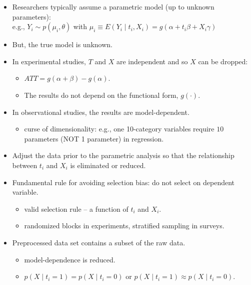 \documentclass[20pt,landscape,pdftex]{foils}
\begin{document}
\hypersetup{pdfpagetransition=Replace}

\begin{itemize}
\item Researchers typically assume a parametric model (up to unknown
  parameters):\\ e.g., $Y_i \sim p(\mu_i, \theta)$ with $\mu_i \equiv
  E(Y_i \mid t_i, X_i)=g(\alpha+t_i \beta + X_i \gamma)$\pause
\item But, the true model is unknown.\pause
\item In experimental studies, $T$ and $X$ are independent and so $X$
  can be dropped:\pause 
  \begin{itemize}
  \item $ATT = g(\alpha+\beta) - g(\alpha).$\pause
  \item The results do not depend on the functional form,
    $g(\cdot)$.\pause 
  \end{itemize}
\item In observational studies, the results are model-dependent.\pause
  \begin{itemize}
  \item curse of dimensionality: e.g., one 10-category variables
    require $10$ parameters (NOT 1 parameter) in regression.\pause
  \end{itemize}
\end{itemize}



\hypersetup{pdfpagetransition=Replace}

\begin{itemize}
\zerolistvertdimens 
\item Adjust the data prior to the parametric analysis so that the
  relationship between $t_i$ and $X_i$ is eliminated or reduced.\pause
  
\item Fundamental rule for avoiding selection bias: do not select on
  dependent variable.\pause
  \begin{itemize}
  \item valid selection rule -- a function of $t_i$ and $X_i$.\pause 
  \item randomized blocks in experiments, stratified sampling in
    surveys.\pause
  \end{itemize}

\item Preprocessed data set contains a subset of the raw data.\pause
  \begin{itemize}
  \item model-dependence is reduced.\pause
  \item $p(X\mid t_i=1) = p(X\mid t_i=0)$ or $p(X\mid t_i=1) \approx
    p(X\mid t_i=0)$.\pause
  \end{itemize}
\end{itemize}
\end{document}
